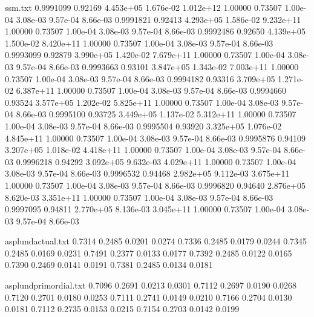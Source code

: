 \begin{filecontents}{ssm.txt}
0.9991099 0.92169 4.453e+05 1.676e-02 1.012e+12 1.00000 0.73507 1.00e-04 3.08e-03 9.57e-04 8.66e-03
0.9991821 0.92413 4.293e+05 1.586e-02 9.232e+11 1.00000 0.73507 1.00e-04 3.08e-03 9.57e-04 8.66e-03
0.9992486 0.92650 4.139e+05 1.500e-02 8.420e+11 1.00000 0.73507 1.00e-04 3.08e-03 9.57e-04 8.66e-03
0.9993099 0.92879 3.990e+05 1.420e-02 7.679e+11 1.00000 0.73507 1.00e-04 3.08e-03 9.57e-04 8.66e-03
0.9993663 0.93101 3.847e+05 1.343e-02 7.003e+11 1.00000 0.73507 1.00e-04 3.08e-03 9.57e-04 8.66e-03
0.9994182 0.93316 3.709e+05 1.271e-02 6.387e+11 1.00000 0.73507 1.00e-04 3.08e-03 9.57e-04 8.66e-03
0.9994660 0.93524 3.577e+05 1.202e-02 5.825e+11 1.00000 0.73507 1.00e-04 3.08e-03 9.57e-04 8.66e-03
0.9995100 0.93725 3.449e+05 1.137e-02 5.312e+11 1.00000 0.73507 1.00e-04 3.08e-03 9.57e-04 8.66e-03
0.9995504 0.93920 3.325e+05 1.076e-02 4.845e+11 1.00000 0.73507 1.00e-04 3.08e-03 9.57e-04 8.66e-03
0.9995876 0.94109 3.207e+05 1.018e-02 4.418e+11 1.00000 0.73507 1.00e-04 3.08e-03 9.57e-04 8.66e-03
0.9996218 0.94292 3.092e+05 9.632e-03 4.029e+11 1.00000 0.73507 1.00e-04 3.08e-03 9.57e-04 8.66e-03
0.9996532 0.94468 2.982e+05 9.112e-03 3.675e+11 1.00000 0.73507 1.00e-04 3.08e-03 9.57e-04 8.66e-03
0.9996820 0.94640 2.876e+05 8.620e-03 3.351e+11 1.00000 0.73507 1.00e-04 3.08e-03 9.57e-04 8.66e-03
0.9997095 0.94811 2.770e+05 8.136e-03 3.045e+11 1.00000 0.73507 1.00e-04 3.08e-03 9.57e-04 8.66e-03
\end{filecontents}

\begin{filecontents}{asplundactual.txt}
0.7314 0.2485 0.0201 0.0274
0.7336 0.2485 0.0179 0.0244
0.7345 0.2485 0.0169 0.0231
0.7491 0.2377 0.0133 0.0177
0.7392 0.2485 0.0122 0.0165
0.7390 0.2469 0.0141 0.0191
0.7381 0.2485 0.0134 0.0181
\end{filecontents}

\begin{filecontents}{asplundprimordial.txt}
0.7096 0.2691 0.0213 0.0301
0.7112 0.2697 0.0190 0.0268
0.7120 0.2701 0.0180 0.0253
0.7111 0.2741 0.0149 0.0210
0.7166 0.2704 0.0130 0.0181
0.7112 0.2735 0.0153 0.0215
0.7154 0.2703 0.0142 0.0199
\end{filecontents}